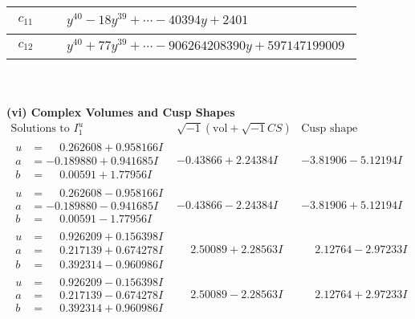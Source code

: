 \documentclass[1p]{elsarticle_modified}
\theoremstyle{definition}
\newcommand{\I}{\sqrt{-1}}
\begin{document}
\begin{tabular}{m{50pt}|m{274pt}}
\hline $$\begin{aligned}c_{11}\end{aligned}$$&$\begin{aligned}
&y^{40}-18 y^{39}+\cdots-40394 y+2401
\end{aligned}$\\
\hline $$\begin{aligned}c_{12}\end{aligned}$$&$\begin{aligned}
&y^{40}+77 y^{39}+\cdots-906264208390 y+597147199009
\end{aligned}$\\
\hline
\end{tabular}\\~\\
\newpage\flushleft \textbf{(vi) Complex Volumes and Cusp Shapes}
$$\begin{array}{c|c|c}  
\text{Solutions to }I^u_{1}& \I (\text{vol} + \sqrt{-1}CS) & \text{Cusp shape}\\
 \hline 
\begin{aligned}
u &= \phantom{-}0.262608 + 0.958166 I \\
a &= -0.189880 + 0.941685 I \\
b &= \phantom{-}0.00591 + 1.77956 I\end{aligned}
 & -0.43866 + 2.24384 I & -3.81906 - 5.12194 I \\ \hline\begin{aligned}
u &= \phantom{-}0.262608 - 0.958166 I \\
a &= -0.189880 - 0.941685 I \\
b &= \phantom{-}0.00591 - 1.77956 I\end{aligned}
 & -0.43866 - 2.24384 I & -3.81906 + 5.12194 I \\ \hline\begin{aligned}
u &= \phantom{-}0.926209 + 0.156398 I \\
a &= \phantom{-}0.217139 + 0.674278 I \\
b &= \phantom{-}0.392314 - 0.960986 I\end{aligned}
 & \phantom{-}2.50089 + 2.28563 I & \phantom{-}2.12764 - 2.97233 I \\ \hline\begin{aligned}
u &= \phantom{-}0.926209 - 0.156398 I \\
a &= \phantom{-}0.217139 - 0.674278 I \\
b &= \phantom{-}0.392314 + 0.960986 I\end{aligned}
 & \phantom{-}2.50089 - 2.28563 I & \phantom{-}2.12764 + 2.97233 I \\ \hline\begin{aligned}

\end{aligned}
\end{array}$$
\end{document}
